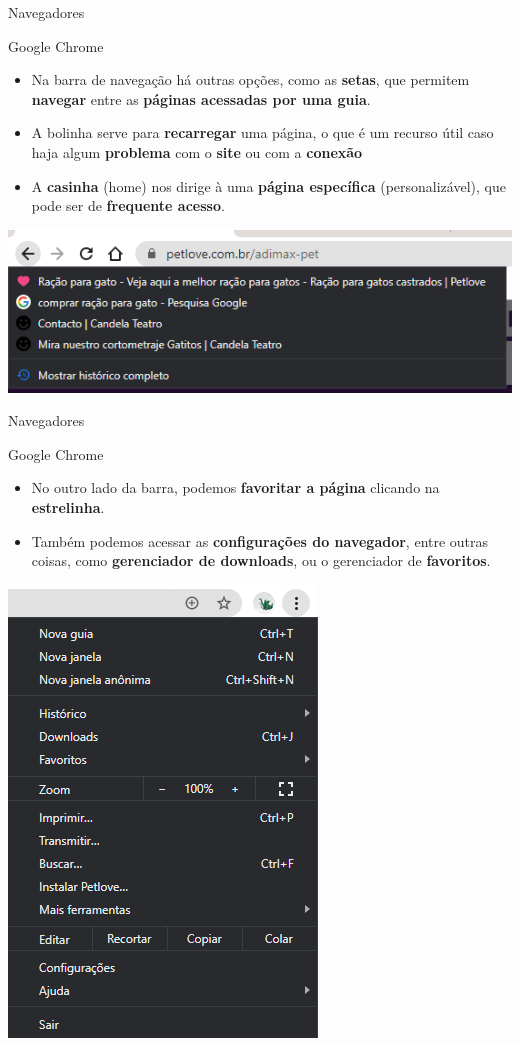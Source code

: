 \begin{frame}{Navegadores}
	\begin{block}{Google Chrome}
		\begin{itemize}
			\item Na barra de navegação há outras opções, como as \textbf{setas}, que permitem \textbf{navegar} entre as \textbf{páginas acessadas por uma guia}.
			\item A bolinha serve para \textbf{recarregar} uma página, o que é um recurso útil caso haja algum \textbf{problema} com o \textbf{site} ou com a \textbf{conexão}
			\item A \textbf{casinha} (home) nos dirige à uma \textbf{página específica} (personalizável), que pode ser de \textbf{frequente acesso}.
		\end{itemize}
	\end{block}
	
	\centering
	\includegraphics[width=0.9\linewidth]{Figuras/Ch03/fig8.10}
\end{frame}


\begin{frame}{Navegadores}
	\begin{block}{Google Chrome}
		\begin{itemize}
			\item No outro lado da barra, podemos \textbf{favoritar a página} clicando na \textbf{estrelinha}.
			\item Também podemos acessar as \textbf{configurações do navegador}, entre outras coisas, como \textbf{gerenciador de downloads}, ou o gerenciador de \textbf{favoritos}.
		\end{itemize}
	\end{block}
	
	\centering
	\includegraphics[width=0.25\linewidth]{Figuras/Ch03/fig8.11}
\end{frame}


